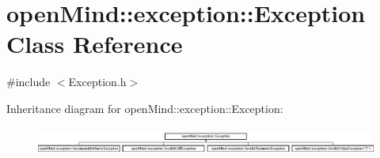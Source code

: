 \hypertarget{classopen_mind_1_1exception_1_1_exception}{\section{open\+Mind\+:\+:exception\+:\+:Exception Class Reference}
\label{classopen_mind_1_1exception_1_1_exception}
}


{\ttfamily \#include $<$Exception.\+h$>$}

Inheritance diagram for open\+Mind\+:\+:exception\+:\+:Exception\+:\begin{figure}[H]
\begin{center}
\leavevmode
\includegraphics[height=0.915033cm]{classopen_mind_1_1exception_1_1_exception}
\end{center}
\end{figure}
